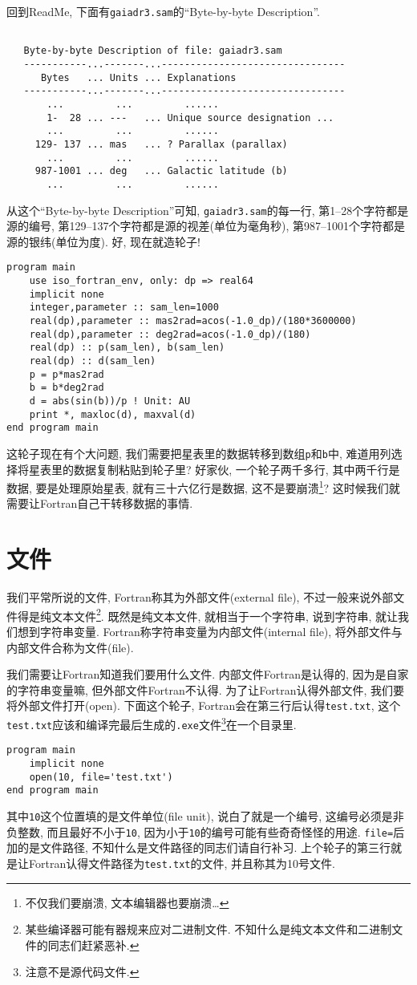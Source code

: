 回到ReadMe, 下面有\texttt{gaiadr3.sam}的``Byte-by-byte Description''.
\begin{lstlisting}

   Byte-by-byte Description of file: gaiadr3.sam
   -----------...-------...--------------------------------
      Bytes   ... Units ... Explanations
   -----------...-------...--------------------------------
       ...         ...         ......
       1-  28 ... ---   ... Unique source designation ...
       ...         ...         ......
     129- 137 ... mas   ... ? Parallax (parallax)
       ...         ...         ......
     987-1001 ... deg   ... Galactic latitude (b)
       ...         ...         ......
\end{lstlisting}
从这个``Byte-by-byte Description''可知, \texttt{gaiadr3.sam}的每一行, 第1--28个字符都是源的编号, 第129--137个字符都是源的视差(单位为毫角秒), 第987--1001个字符都是源的银纬(单位为度). 好, 现在就造轮子!\label{gaiadr3.sam}
\begin{lstlisting}
program main
    use iso_fortran_env, only: dp => real64
    implicit none
    integer,parameter :: sam_len=1000
    real(dp),parameter :: mas2rad=acos(-1.0_dp)/(180*3600000)
    real(dp),parameter :: deg2rad=acos(-1.0_dp)/(180)
    real(dp) :: p(sam_len), b(sam_len)
    real(dp) :: d(sam_len)
    p = p*mas2rad
    b = b*deg2rad
    d = abs(sin(b))/p ! Unit: AU
    print *, maxloc(d), maxval(d)
end program main
\end{lstlisting}
这轮子现在有个大问题, 我们需要把星表里的数据转移到数组\texttt{p}和\texttt{b}中, 难道用列选择将星表里的数据复制粘贴到轮子里? 好家伙, 一个轮子两千多行, 其中两千行是数据, 要是处理原始星表, 就有三十六亿行是数据, 这不是要崩溃\footnote{不仅我们要崩溃, 文本编辑器也要崩溃\dots}? 这时候我们就需要让Fortran自己干转移数据的事情.

\section{文件}

我们平常所说的文件, Fortran称其为外部文件(external file), 不过一般来说外部文件得是纯文本文件\footnote{某些编译器可能有器规来应对二进制文件. 不知什么是纯文本文件和二进制文件的同志们赶紧恶补.}. 既然是纯文本文件, 就相当于一个字符串, 说到字符串, 就让我们想到字符串变量. Fortran称字符串变量为内部文件(internal file), 将外部文件与内部文件合称为文件(file).

我们需要让Fortran知道我们要用什么文件. 内部文件Fortran是认得的, 因为是自家的字符串变量嘛, 但外部文件Fortran不认得. 为了让Fortran认得外部文件, 我们要将外部文件打开(open). 下面这个轮子, Fortran会在第三行后认得\texttt{test.txt}, 这个\texttt{test.txt}应该和编译完最后生成的\texttt{.exe}文件\footnote{注意不是源代码文件.}在一个目录里.
\begin{lstlisting}
program main
    implicit none
    open(10, file='test.txt')
end program main
\end{lstlisting}
其中\texttt{10}这个位置填的是文件单位(file unit), 说白了就是一个编号, 这编号必须是非负整数, 而且最好不小于\texttt{10}, 因为小于\texttt{10}的编号可能有些奇奇怪怪的用途. \texttt{file=}后加的是文件路径, 不知什么是文件路径的同志们请自行补习. 上个轮子的第三行就是让Fortran认得文件路径为\texttt{test.txt}的文件, 并且称其为10号文件.

